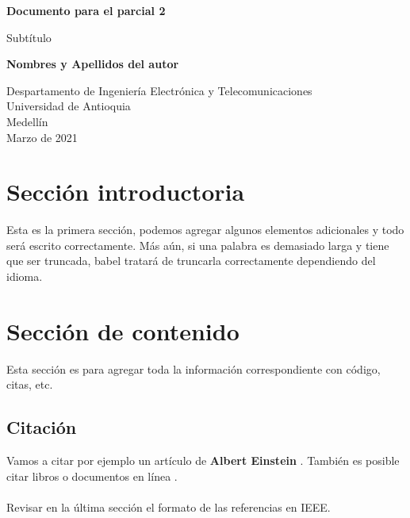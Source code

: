 \documentclass{article}
\begin{document}
\begin{titlepage}
    \begin{center}
        \vspace*{1cm}
            
        \Huge
        \textbf{Documento para el parcial 2}
            
        \vspace{0.5cm}
        \LARGE
        Subtítulo
            
        \vspace{1.5cm}
            
        \textbf{Nombres y Apellidos del autor}
            
        \vfill
            
        \vspace{0.8cm}
            
        \Large
        Despartamento de Ingeniería Electrónica y Telecomunicaciones\\
        Universidad de Antioquia\\
        Medellín\\
        Marzo de 2021
            
    \end{center}
\end{titlepage}

\tableofcontents
\newpage
\section{Sección introductoria}\label{intro}
Esta es la primera sección, podemos agregar algunos elementos adicionales y todo será escrito correctamente. Más aún, si una palabra es demasiado larga y tiene que ser truncada, babel tratará de truncarla correctamente dependiendo del idioma.

\section{Sección de contenido} \label{contenido}
Esta sección es para agregar toda la información correspondiente con código, citas, etc.
\subsection{Citación}
Vamos a citar por ejemplo un artículo de \textbf{Albert Einstein} \cite{einstein}.
También es posible citar libros \cite{dirac} o documentos en línea \cite{knuthwebsite}.\\\\
Revisar en la última sección el formato de las referencias en IEEE.
\end{document}
